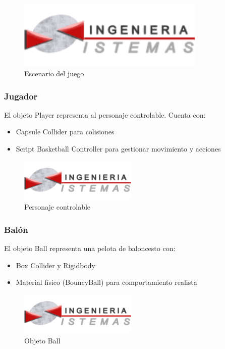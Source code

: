 \begin{figure}[h]
    \centering
    \includegraphics[width=0.8\textwidth]{img/epis.png}
    \caption{Escenario del juego}
    \label{fig:escenario}
\end{figure}

\subsubsection{Jugador}
El objeto Player representa al personaje controlable. Cuenta con:
\begin{itemize}
    \item Capsule Collider para colisiones
    \item Script Basketball Controller para gestionar movimiento y acciones
\end{itemize}

\begin{figure}[h]
    \centering
    \includegraphics[width=0.5\textwidth]{img/epis.png}
    \caption{Personaje controlable}
    \label{fig:jugador}
\end{figure}

\subsubsection{Balón}
El objeto Ball representa una pelota de baloncesto con:
\begin{itemize}
    \item Box Collider y Rigidbody
    \item Material físico (BouncyBall) para comportamiento realista
\end{itemize}

\begin{figure}[h]
    \centering
    \includegraphics[width=0.5\textwidth]{img/epis.png}
    \caption{Objeto Ball}
    \label{fig:balon}
\end{figure}

